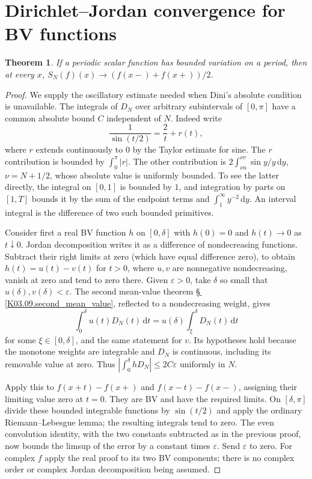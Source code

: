 \documentclass[11pt,oneside,a4paper]{book}
\newtheorem{theorem}{Theorem}[chapter]
\theoremstyle{definition}
\theoremstyle{remark}
\newcommand{\eps}{\varepsilon}
\newcommand{\dd}{\,\mathrm d}
\newcommand{\KEntry}[2]{\Needspace{7\baselineskip}\section{#2}\label{#1}{\small\sffamily\color{black!60}\detokenize{#1}}\par}
\newcommand{\KRef}[1]{\hyperref[#1]{\S\,\ref*{#1}}}
\begin{document}
\KEntry{K03.19.jordan}{Dirichlet--Jordan convergence for BV functions}
\begin{theorem}
If a periodic scalar function has bounded variation on a period, then at
every $x$,
$S_N(f)(x)\to(f(x-)+f(x+))/2$.
\end{theorem}
\begin{proof}
We supply the oscillatory estimate needed when Dini's absolute condition
is unavailable. The integrals of $D_N$ over arbitrary subintervals of
$[0,\pi]$ have a common absolute bound $C$ independent of $N$.
Indeed write
\[
 \frac1{\sin(t/2)}=\frac2t+r(t),
\]
where $r$ extends continuously to $0$ by the Taylor estimate for sine.
The $r$ contribution is bounded by $\int_0^\pi|r|$. The other contribution
is $2\int_{\nu u}^{\nu v}\sin y/y\dd y$, $\nu=N+1/2$, whose absolute
value is uniformly bounded. To see the latter directly, the integral on
$[0,1]$ is bounded by $1$, and integration by parts on $[1,T]$ bounds
it by the sum of the endpoint terms and $\int_1^\infty y^{-2}\dd y$.
An interval integral is the difference of two such bounded primitives.

Consider first a real BV function $h$ on $[0,\delta]$ with $h(0)=0$ and
$h(t)\to0$ as $t\downarrow0$. Jordan decomposition writes it as a
difference of nondecreasing functions. Subtract their right limits at zero
(which have equal difference zero), to obtain
$h(t)=u(t)-v(t)$ for $t>0$, where $u,v$ are nonnegative nondecreasing,
vanish at zero and tend to zero there. Given $\eps>0$, take $\delta$ so
small that $u(\delta),v(\delta)<\eps$.
The second mean-value theorem \KRef{K03.09.second_mean_value}, reflected to a nondecreasing
weight, gives
\[
 \int_0^\delta u(t)D_N(t)\dd t
       =u(\delta)\int_\xi^\delta D_N(t)\dd t
\]
for some $\xi\in[0,\delta]$, and the same statement for $v$.
Its hypotheses hold because the monotone weights are integrable and
$D_N$ is continuous, including its removable value at zero. Thus
$|\int_0^\delta hD_N|\leq2C\eps$ uniformly in $N$.

Apply this to $f(x+t)-f(x+)$ and $f(x-t)-f(x-)$, assigning their limiting
value zero at $t=0$. They are BV and have the required limits. On
$[\delta,\pi]$ divide these bounded integrable functions by $\sin(t/2)$
and apply the ordinary Riemann--Lebesgue lemma; the resulting integrals
tend to zero. The even convolution identity, with the two constants
subtracted as in the previous proof, now bounds the limsup of the error
by a constant times $\eps$. Send $\eps$ to zero. For complex $f$ apply
the real proof to its two BV components; there is no complex order or
complex Jordan decomposition being assumed.
\end{proof}
\end{document}
